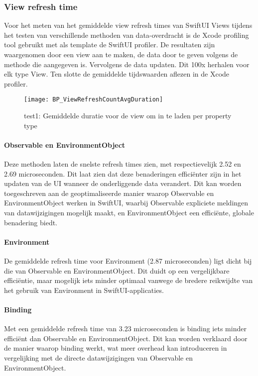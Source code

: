 \newpage
\subsubsection{View refresh time}
Voor het meten van het gemiddelde view refresh times van SwiftUI Views tijdens het testen van verschillende methoden van data-overdracht is de Xcode profiling tool gebruikt met als template de SwiftUI profiler. De resultaten zijn waargenomen door een view aan te maken, de data door te geven volgens de methode die aangegeven is. Vervolgens de data updaten. Dit 100x herhalen voor elk type View. Ten slotte de gemiddelde tijdswaarden aflezen in de Xcode profiler.

\begin{figure}[htbp]
    \centering
    \texttt{[image: BP\_ViewRefreshCountAvgDuration]} 
    \caption{test1: Gemiddelde duratie voor de view om in te laden per property type}
    \label{fig:propertyRefreshDuration}
\end{figure}

\paragraph{Observable en EnvironmentObject}
Deze methoden laten de snelste refresh times zien, met respectievelijk 2.52 en 2.69 microseconden. Dit laat zien dat deze benaderingen efficiënter zijn in het updaten van de UI wanneer de onderliggende data verandert. Dit kan worden toegeschreven aan de geoptimaliseerde manier waarop Observable en EnvironmentObject werken in SwiftUI, waarbij Observable expliciete meldingen van datawijzigingen mogelijk maakt, en EnvironmentObject een efficiënte, globale benadering biedt.

\paragraph{Environment}
De gemiddelde refresh time voor Environment (2.87 microseconden) ligt dicht bij die van Observable en EnvironmentObject. Dit duidt op een vergelijkbare efficiëntie, maar mogelijk iets minder optimaal vanwege de bredere reikwijdte van het gebruik van Environment in SwiftUI-applicaties.

\paragraph{Binding}
Met een gemiddelde refresh time van 3.23 microseconden is binding iets minder efficiënt dan Observable en EnvironmentObject. Dit kan worden verklaard door de manier waarop binding werkt, wat meer overhead kan introduceren in vergelijking met de directe datawijzigingen van Observable en EnvironmentObject.


